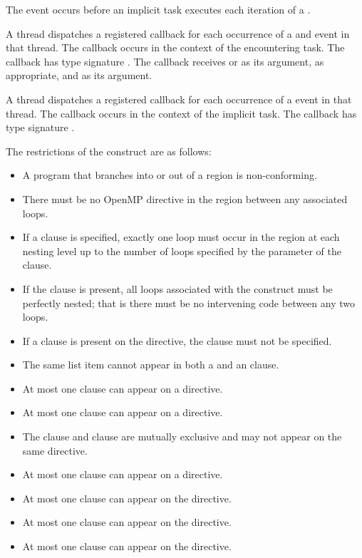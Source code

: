 The  event occurs before an implicit
task executes each iteration of a .

\tools

A thread dispatches a registered 
callback for each occurrence of a  and
 event in that thread. The callback occurs in the
context of the encountering task.  The callback has type signature
. The callback receives
 or 
as its  argument, as appropriate, and
 as its  argument.

A thread dispatches a registered 
callback for each occurrence of a  
event in that thread. The callback occurs in the
context of the implicit task.  The callback has type signature
. 

\restrictions
The restrictions of the  construct are as follows:
\begin{itemize}
\item A program that branches into or out of a  region is non-conforming.

\item There must be no OpenMP directive in the region between any
associated loops.

\item If a  clause is specified, exactly one loop must
occur in the region at each nesting level up to the number of loops
specified by the parameter of the  clause.

\item If the  clause is present, all loops associated
with the construct must be perfectly nested; that is there must be
no intervening code between any two loops.

\item If a  clause is present on the  directive, the  clause must not be specified.
\item The same list item cannot appear in both a  and an  clause.
\item At most one  clause can appear on a  directive.
\item At most one  clause can appear on a  directive.
\item The  clause and  clause are mutually exclusive and may not appear on the same  directive.
\item At most one  clause can appear on a  directive.
\item At most one  clause can appear on the directive.
\item At most one  clause can appear on the directive.
\item At most one  clause can appear on the directive.
\end{itemize}

